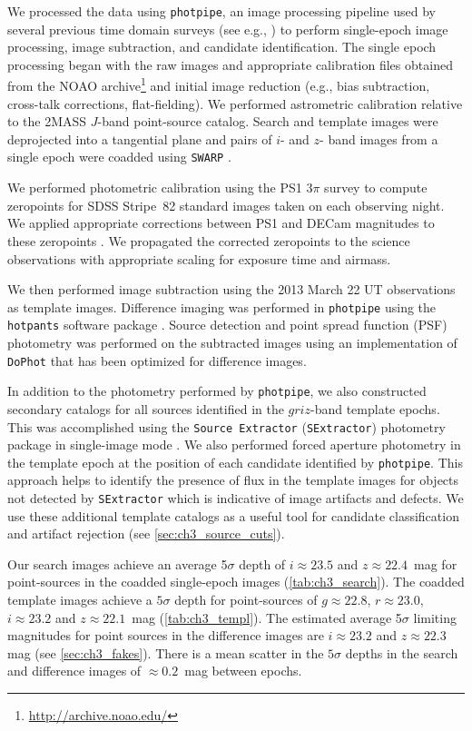 \clearpage
We processed the data using {\tt photpipe}, an image processing pipeline used by several previous time domain surveys (see e.g., \citealt{Rest+05,Rest+14}) to perform single-epoch image processing, image subtraction, and candidate identification. The single epoch processing began with the raw images and appropriate calibration files obtained from the NOAO archive\footnote{\singlespace \url{http://archive.noao.edu/}} and initial image reduction (e.g., bias subtraction, cross-talk corrections, flat-fielding). We performed astrometric calibration relative to the 2MASS $J$-band point-source catalog. Search and template images were deprojected into a tangential plane and pairs of $i$- and $z$- band images from a single epoch were coadded using {\tt SWARP} \citep{Bertin+02}.

We performed photometric calibration using the PS1 3$\pi$ survey to compute zeropoints for SDSS Stripe~82 standard images taken on each observing night. We applied appropriate corrections between PS1 and DECam magnitudes to these zeropoints \citep{Scolnic+15}. We propagated the corrected zeropoints to the science observations with appropriate scaling for exposure time and airmass.

We then performed image subtraction using the 2013 March 22 UT observations as template images. Difference imaging was performed in {\tt photpipe} using the {\tt hotpants} software package \citep{Alard2000,Becker2015}. Source detection and point spread function (PSF) photometry was performed on the subtracted images using an implementation of {\tt DoPhot} \citep{Schechter+93} that has been optimized for difference images.

\clearpage
In addition to the photometry performed by {\tt photpipe}, we also constructed secondary catalogs for all sources identified in the $griz$-band template epochs. This was accomplished using the {\tt Source Extractor} ({\tt SExtractor}) photometry package in single-image mode \citep{BertinArnouts96}. We also performed forced aperture photometry in the template epoch at the position of each candidate identified by {\tt photpipe}. This approach helps to identify the presence of flux in the template images for objects not detected by {\tt SExtractor} which is indicative of image artifacts and defects. We use these additional template catalogs as a useful tool for candidate classification and artifact rejection (see \cref{sec:ch3_source_cuts}).

Our search images achieve an average 5$\sigma$ depth of $i \approx 23.5$ and $z \approx 22.4$~mag for point-sources in the coadded single-epoch images (\cref{tab:ch3_search}). The coadded template images achieve a $5\sigma$ depth for point-sources of $g \approx 22.8$, $r \approx 23.0$, $i \approx 23.2$ and $z \approx 22.1$~mag (\cref{tab:ch3_templ}). The estimated average 5$\sigma$ limiting magnitudes for point sources in the difference images are $i \approx 23.2$ and $z \approx 22.3$ mag (see \cref{sec:ch3_fakes}). There is a mean scatter in the $5\sigma$ depths in the search and difference images of $\approx 0.2$~mag between epochs.

